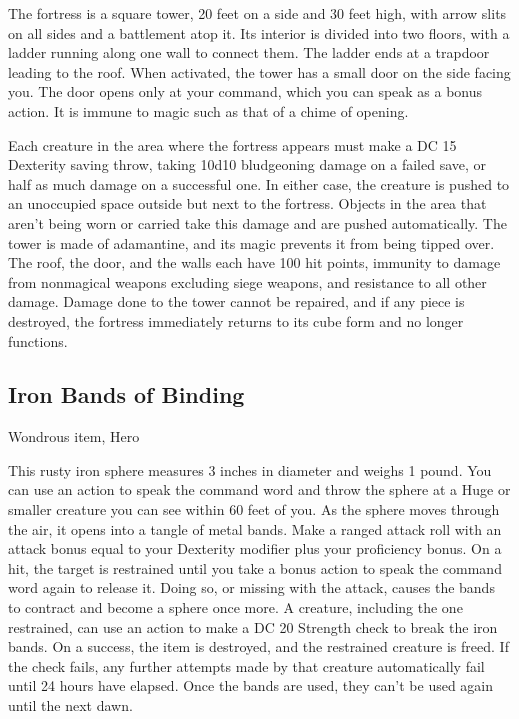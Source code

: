 The fortress is a square tower, 20 feet on a side and 30 feet high, with arrow slits on all sides and a battlement atop it. Its interior is divided into two floors, with a ladder running along one wall to connect them. The ladder ends at a trapdoor leading to the roof. When activated, the tower has a small door on the side facing you. The door opens only at your command, which you can speak as a bonus action. It is immune to magic such as that of a chime of opening.

Each creature in the area where the fortress appears must make a DC 15 Dexterity saving throw, taking 10d10 bludgeoning damage on a failed save, or half as much damage on a successful one. In either case, the creature is pushed to an unoccupied space outside but next to the fortress. Objects in the area that aren't being worn or carried take this damage and are pushed automatically.  The tower is made of adamantine, and its magic prevents it from being tipped over. The roof, the door, and the walls each have 100 hit points, immunity to damage from nonmagical weapons excluding siege weapons, and resistance to all other damage. Damage done to the tower cannot be repaired, and if any piece is destroyed, the fortress immediately returns to its cube form and no longer functions.

\subsection{Iron Bands of Binding}
Wondrous item, Hero 

This rusty iron sphere measures 3 inches in diameter and weighs 1 pound. You can use an action to speak the command word and throw the sphere at a Huge or smaller creature you can see within 60 feet of you. As the sphere moves through the air, it opens into a tangle of metal bands.  Make a ranged attack roll with an attack bonus equal to your Dexterity modifier plus your proficiency bonus. On a hit, the target is restrained until you take a bonus action to speak the command word again to release it. Doing so, or missing with the attack, causes the bands to contract and become a sphere once more.  A creature, including the one restrained, can use an action to make a DC 20 Strength check to break the iron bands. On a success, the item is destroyed, and the restrained creature is freed. If the check fails, any further attempts made by that creature automatically fail until 24 hours have elapsed.  Once the bands are used, they can't be used again until the next dawn.

